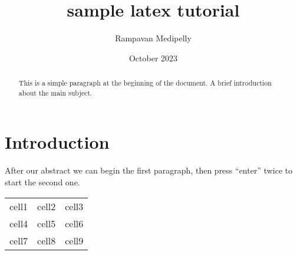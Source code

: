 \documentclass[12pt,a4paper]{article}
\title{sample latex tutorial}
\author{Rampavan Medipelly}
\date{October 2023}
\begin{document}
\maketitle
\tableofcontents

\begin{abstract}
This is a simple paragraph at the beginning of the
document. A brief introduction about the main subject.
\end{abstract}

\section{Introduction}
After our abstract we can begin the first paragraph, then press ``enter'' twice to start the second one.


\begin{center}
\begin{tabular}{|c |c |c|}
\hline
 cell1 & cell2 & cell3 \\
 cell4 & cell5 & cell6 \\  
 cell7 & cell8 & cell9  \\
 \hline
\end{tabular}
\end{center}
\end{document}
